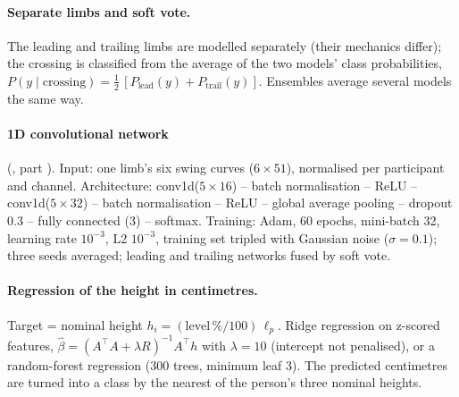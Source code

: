 \paragraph{Separate limbs and soft vote.} The leading and trailing limbs are modelled separately (their mechanics differ);
the crossing is classified from the average of the two models' class probabilities,
$P(y \mid \text{crossing}) = \tfrac12\,[P_{\text{lead}}(y) + P_{\text{trail}}(y)]$. Ensembles average several models the same
way.

\paragraph{1D convolutional network} (, part ). Input: one limb's six swing curves
($6 \times 51$), normalised per participant and channel. Architecture: conv1d($5 \times 16$) -- batch normalisation -- ReLU --
conv1d($5 \times 32$) -- batch normalisation -- ReLU -- global average pooling -- dropout 0.3 -- fully connected (3) --
softmax. Training: Adam, 60 epochs, mini-batch 32, learning rate $10^{-3}$, L2 $10^{-3}$, training set tripled with Gaussian
noise ($\sigma = 0.1$); three seeds averaged; leading and trailing networks fused by soft vote.

\paragraph{Regression of the height in centimetres.} Target = nominal height $h_i = (\text{level}\,\% / 100)\,\ell_p$.
Ridge regression on z-scored features, $\hat\beta = (A^\top A + \lambda R)^{-1} A^\top h$ with $\lambda = 10$ (intercept not
penalised), or a random-forest regression (300 trees, minimum leaf 3). The predicted centimetres are turned into a class by
the nearest of the person's three nominal heights.

